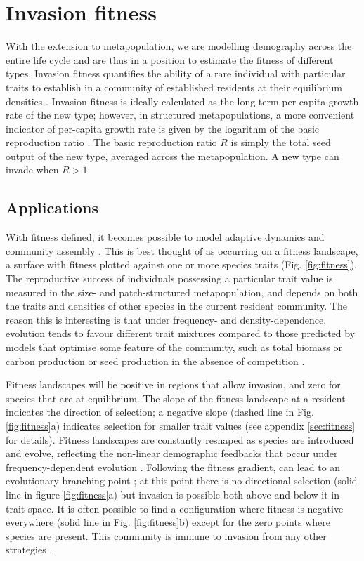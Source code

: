 \documentclass[a4paper,11pt]{article}
\begin{document}
\section{Invasion fitness}

With the extension to metapopulation, we are modelling demography across
the entire life cycle and are thus in a position to estimate the fitness
of different types. Invasion fitness quantifies the ability of a rare
individual with particular traits to establish in a community of
established residents at their equilibrium densities \citep{Metz-1992}.
Invasion fitness
is ideally calculated as the long-term per capita growth rate of the new
type; however, in structured metapopulations, a more convenient
indicator of per-capita growth rate is given by the logarithm of the
basic reproduction ratio \citep{Gyllenberg-2001, Metz-2001}. The basic
reproduction ratio \(R\) is simply the total seed output of the new
type, averaged across the metapopulation. A new type can invade when
\(R > 1\).

\subsection{Applications}

With fitness defined, it becomes possible to model adaptive dynamics
and community assembly \citep{Dieckmann-2007, Geritz-1998}. This is best
thought of as occurring on a fitness landscape, a surface with fitness
plotted against one or more species traits (Fig. \ref{fig:fitness}). The
reproductive success of individuals possessing a particular trait value
is measured in the size- and patch-structured metapopulation, and
depends on both the traits and densities of other species in the current
resident community. The reason this is interesting is that under
frequency- and density-dependence, evolution tends to favour different
trait mixtures compared to those predicted by models that optimise some
feature of the community, such as total biomass or carbon production or
seed production in the absence of competition
\citep{Falster-2003, Dieckmann-2007}.

Fitness landscapes will be positive in regions that allow invasion,
and zero for species that are at equilibrium. The slope of the fitness
landscape at a resident indicates the direction of selection; a
negative slope (dashed line in Fig. \ref{fig:fitness}a) indicates
selection for smaller trait values (see appendix \ref{sec:fitness} for
details). Fitness landscapes are constantly reshaped as species are
introduced and evolve, reflecting the non-linear demographic feedbacks
that occur under frequency-dependent evolution
\citep{Geritz-1998,Dieckmann-2007}. Following the fitness gradient,
can lead to an evolutionary branching point
\citep{Geritz-1998,Dieckmann-2007}; at this point there is no
directional selection (solid line in figure \ref{fig:fitness}a) but
invasion is possible both above and below it in trait space. It is
often possible to find a configuration where fitness is negative
everywhere (solid line in Fig. \ref{fig:fitness}b) except for the zero
points where species are present. This community is immune to invasion
from any other strategies \citep{Geritz-1998}.
\end{document}
